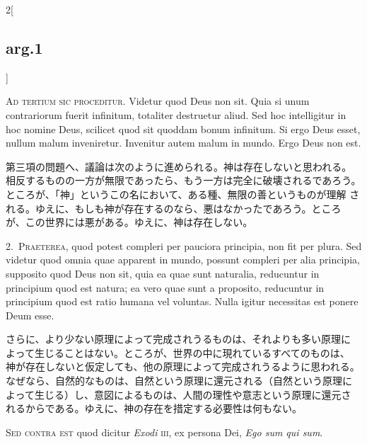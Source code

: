 \documentclass[paper=a4paper,fontsize=10pt,jafontsize=9pt,titlepage]{jlreq}
\begin{document}
\begin{paracol}{2}[\subsection{arg.1}]

{\Huge A}{\scshape d tertium sic proceditur}. Videtur quod Deus
non sit. Quia si unum contrariorum fuerit infinitum, totaliter
destruetur aliud. Sed hoc intelligitur in hoc nomine Deus, scilicet quod
sit quoddam bonum infinitum. Si ergo Deus esset, nullum malum
inveniretur. Invenitur autem malum in mundo. Ergo Deus non est.

\switchcolumn

第三項の問題へ、議論は次のように進められる。神は存在しないと思われる。
相反するものの一方が無限であったら、もう一方は完全に破壊されるであろう。
ところが、「神」というこの名において、ある種、無限の善というものが理解
される。ゆえに、もしも神が存在するのなら、悪はなかったであろう。ところ
が、この世界には悪がある。ゆえに、神は存在しない。


2.~{\scshape  Praeterea}, quod potest compleri per pauciora
principia, non fit per plura. Sed videtur quod omnia quae apparent in
mundo, possunt compleri per alia principia, supposito quod Deus non sit,
quia ea quae sunt naturalia, reducuntur in principium quod est natura;
ea vero quae sunt a proposito, reducuntur in principium quod est ratio
humana vel voluntas. Nulla igitur necessitas est ponere Deum esse.

\switchcolumn

さらに、より少ない原理によって完成されうるものは、それよりも多い原理に
よって生じることはない。ところが、世界の中に現れているすべてのものは、
神が存在しないと仮定しても、他の原理によって完成されうるように思われる。
なぜなら、自然的なものは、自然という原理に還元される（自然という原理に
よって生じる）し、意図によるものは、人間の理性や意志という原理に還元さ
れるからである。ゆえに、神の存在を措定する必要性は何もない。

\switchcolumn*[\subsection{s.c.}]

{\scshape Sed contra est} quod dicitur {\itshape Exodi} {\scshape iii}, ex
persona Dei, {\itshape Ego sum qui sum}.


\end{paracol}
\end{document}

